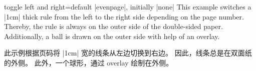 \begin{docTcbKey}[][doc updated=2017-02-16]{toggle left and right}{=}{default |evenpage|, initially |none|}
This example switches a |1cm| thick rule from the left to the right side
depending on the page number. Thereby, the rule is always on the outer side
of the double-sided paper. Additionally, a ball is drawn on the outer side
with help of an overlay.

此示例根据页码将 |1cm| 宽的线条从左边切换到右边。
因此，线条总是在双面纸的外侧。
此外，一个球形，通过 overlay 绘制在外侧。
\bigskip

\tcbusetemp
\end{docTcbKey}

